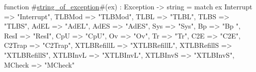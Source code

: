 function #\hyperref[zstringzyofzyexception]{string\_of\_exception}#(ex) : Exception -> string = 
   match ex {
      Interrupt    => "Interrupt",
      TLBMod       => "TLBMod",
      TLBL         => "TLBL",
      TLBS         => "TLBS",
      AdEL         => "AdEL",
      AdES         => "AdES",
      Sys          => "Sys",
      Bp           => "Bp  ",
      ResI         => "ResI",
      CpU          => "CpU",
      Ov           => "Ov",
      Tr           => "Tr",
      C2E          => "C2E",
      C2Trap       => "C2Trap",
      XTLBRefillL  => "XTLBRefillL",
      XTLBRefillS  => "XTLBRefillS",
      XTLBInvL     => "XTLBInvL",
      XTLBInvS     => "XTLBInvS",
      MCheck       => "MCheck"
   }
